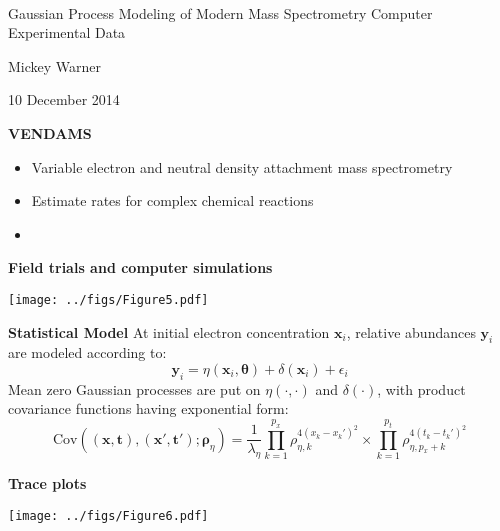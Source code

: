 \documentclass[mathserif, 11pt, t]{beamer}
\newcommand{\m}[1]{\mathbf{\bm{#1}}}
\renewcommand{\subtitle}[1]{\vspace{0.45cm}\textcolor{bluegreen}{
    {\textbf{#1}}}\vspace{0.15cm}\newline}
\begin{document}
\begin{center}
\ \\ [-0.5in]
\vfill
\bigskip
\bigskip
\bigskip
\bigskip
\bigskip

\begin{LARGE}
\begin{center}
Gaussian Process Modeling of Modern Mass Spectrometry Computer Experimental Data
\end{center}
\end{LARGE}
\vfill

\begin{center}
Mickey Warner
\end{center}
\vfill
10 December 2014
\bigskip
\bigskip
\bigskip
\vfill
\ \\ [-0.5in]
\end{center}

\begin{frame}
\subtitle{VENDAMS}
\begin{itemize}[label={$\cdot$}]
\item Variable electron and neutral density attachment mass spectrometry
\item Estimate rates for complex chemical reactions
\item 
\end{itemize}
\end{frame}

\begin{frame}
\subtitle{Field trials and computer simulations}
\begin{center}
\texttt{[image: ../figs/Figure5.pdf]}
\end{center}
\end{frame}

\begin{frame}
\subtitle{Statistical Model}
At initial electron concentration $\m{x}_i$, relative abundances $\m{y}_i$ are modeled according to:
\[\m{y}_i = \eta(\m{x}_i, \m{\theta}) + \delta(\m{x}_i) + \epsilon_i\]
Mean zero Gaussian processes are put on $\eta(\cdot, \cdot)$ and $\delta(\cdot)$, with product covariance functions having exponential form:
\[ \mathrm{Cov}((\m{x},\m{t}),(\m{x}',\m{t}'); \m{\rho}_\eta) = \frac{1}{\lambda_\eta}\prod_{k=1}^{p_x}\rho_{\eta,k}^{4(x_k-x_k')^2}\times\prod_{k=1}^{p_t}\rho_{\eta,p_x+k}^{4(t_k-t_k')^2} \]
\end{frame}

\begin{frame}
\subtitle{Trace plots}
\begin{center}
\texttt{[image: ../figs/Figure6.pdf]}
\end{center}
\end{frame}
\end{document}
